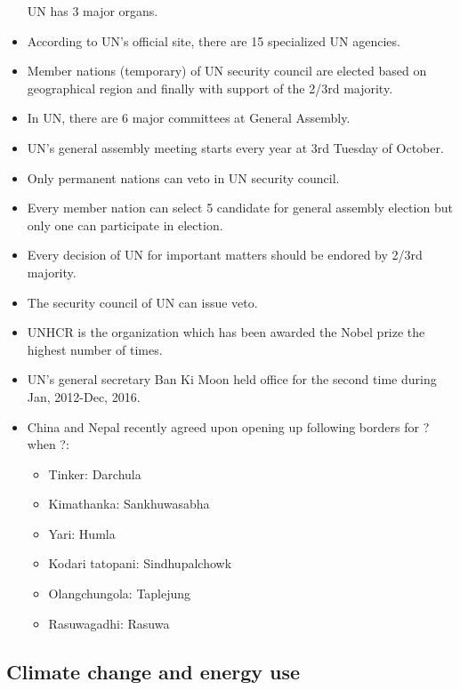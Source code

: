 \documentclass[
]{book}
\providecommand{\tightlist}{%
  \setlength{\itemsep}{0pt}\setlength{\parskip}{0pt}}
\begin{document}
\begin{itemize}
  UN has 3 major organs.
\item
  According to UN's official site, there are 15 specialized UN agencies.
\item
  Member nations (temporary) of UN security council are elected based on geographical region and finally with support of the 2/3rd majority.
\item
  In UN, there are 6 major committees at General Assembly.
\item
  UN's general assembly meeting starts every year at 3rd Tuesday of October.
\item
  Only permanent nations can veto in UN security council.
\item
  Every member nation can select 5 candidate for general assembly election but only one can participate in election.
\item
  Every decision of UN for important matters should be endored by 2/3rd majority.
\item
  The security council of UN can issue veto.
\item
  UNHCR is the organization which has been awarded the Nobel prize the highest number of times.
\item
  UN's general secretary Ban Ki Moon held office for the second time during Jan, 2012-Dec, 2016.
\item
  China and Nepal recently agreed upon opening up following borders for ? when ?:

  \begin{itemize}
  \tightlist
  \item
    Tinker: Darchula
  \item
    Kimathanka: Sankhuwasabha
  \item
    Yari: Humla
  \item
    Kodari tatopani: Sindhupalchowk
  \item
    Olangchungola: Taplejung
  \item
    Rasuwagadhi: Rasuwa
  \end{itemize}
\end{itemize}

\hypertarget{climate-change-and-energy-use}{%
\subsection{Climate change and energy use}\label{climate-change-and-energy-use}}
\end{document}
